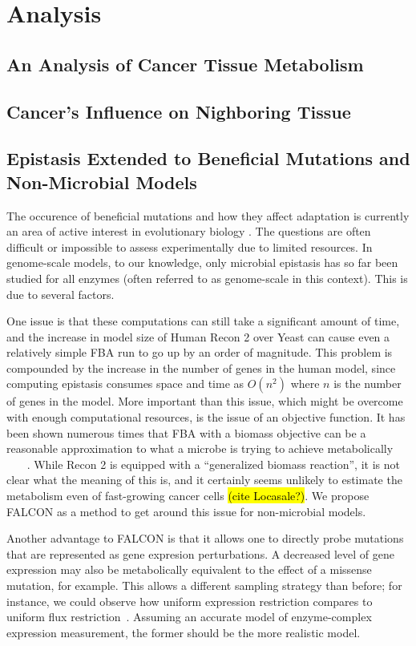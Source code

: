 \documentclass[phd,tocprelim,draft]{cornell}
\begin{document}
\section{Analysis}

\subsection{An Analysis of Cancer Tissue Metabolism}
\subsection{Cancer's Influence on Nighboring Tissue}
\subsection{Epistasis Extended to Beneficial Mutations and Non-Microbial Models}

The occurence of beneficial mutations and how they affect adaptation
is currently an area of active interest in evolutionary biology
\cite{Chou2011} \cite{Weinreich2006}. The questions are often
difficult or impossible to assess experimentally due to limited
resources.  In genome-scale models, to our knowledge, only microbial
epistasis has so far been studied for all enzymes (often referred to
as genome-scale in this context). This is due to several factors.

One issue is that these computations can still take a significant
amount of time, and the increase in model size of Human Recon 2 over
Yeast can cause even a relatively simple FBA run to go up by an order
of magnitude.  This problem is compounded by the increase in the
number of genes in the human model, since computing epistasis consumes
space and time as $O(n^2)$ where $n$ is the number of genes in the
model. More important than this issue, which might be overcome with
enough computational resources, is the issue of an objective
function. It has been shown numerous times that FBA with a biomass
objective can be a reasonable approximation to what a microbe is
trying to achieve metabolically
~\cite{Schuetz2012}~\cite{Fong2004}~\cite{Varma1994} . While Recon 2
is equipped with a ``generalized biomass reaction'', it is not clear
what the meaning of this is, and it certainly seems unlikely to
estimate the metabolism even of fast-growing cancer cells \hl{(cite
  Locasale?)}. We propose FALCON as a method to get around this issue
for non-microbial models.

Another advantage to FALCON is that it allows one to directly probe
mutations that are represented as gene expresion perturbations. A
decreased level of gene expression may also be metabolically
equivalent to the effect of a missense mutation, for example. This
allows a different sampling strategy than before; for instance, we
could observe how uniform expression restriction compares to uniform
flux restriction~\cite{Xu2012}. Assuming an accurate model of
enzyme-complex expression measurement, the former should be the more
realistic model.
\end{document}
